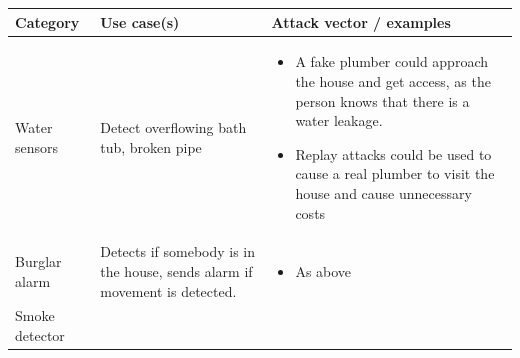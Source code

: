 \begin{longtable}[c]{|l|l|l|}
\hline
\begin{minipage}[t]{0.20\columnwidth}\raggedright\strut
\textbf{Category}
\strut\end{minipage} &
\begin{minipage}[t]{0.30\columnwidth}\raggedright\strut
\textbf{Use case(s)}
\strut\end{minipage} &
\begin{minipage}[t]{0.40\columnwidth}\raggedright\strut
\textbf{Attack vector / examples}
\strut\end{minipage}\tabularnewline
\hline
\begin{minipage}[t]{0.20\columnwidth}\raggedright\strut
{Water sensors}
\strut\end{minipage} &
\begin{minipage}[t]{0.30\columnwidth}\raggedright\strut
{Detect overflowing bath tub, broken pipe}
\strut\end{minipage} &
\begin{minipage}[t]{0.40\columnwidth}\raggedright\strut
\begin{itemize}
\tightlist
\item
  {A fake plumber could approach the house and get access, as the person
  knows that there is a water leakage.}
\item
  {Replay attacks could be used to cause a real plumber to visit the
  house and cause unnecessary costs}
\end{itemize}
\strut\end{minipage}\tabularnewline
\hline
\begin{minipage}[t]{0.20\columnwidth}\raggedright\strut
{Burglar alarm}
\strut\end{minipage} &
\begin{minipage}[t]{0.30\columnwidth}\raggedright\strut
{Detects if somebody is in the house, sends alarm if movement is
detected.}
\strut\end{minipage} &
\begin{minipage}[t]{0.40\columnwidth}\raggedright\strut
\begin{itemize}
\tightlist
\item
  {As above}
\end{itemize}
\strut\end{minipage}\tabularnewline
\hline
\begin{minipage}[t]{0.20\columnwidth}\raggedright\strut
{Smoke detector}
\strut\end{minipage} &
\begin{minipage}[t]{0.30\columnwidth}\raggedright\strut

\end{minipage}
\end{longtable}
